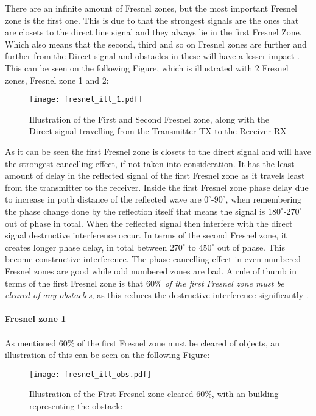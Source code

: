 There are an infinite amount of Fresnel zones, but the most important Fresnel zone is the first one. This is due to that the strongest signals are the ones that are closets to the direct line signal %
and they always lie in the first Fresnel Zone.  
Which also means that the second, third and so on Fresnel zones are further and further from the Direct signal and obstacles in these will have a lesser impact \citep{introRF}. This can be seen on the following Figure, which is illustrated with 2 Fresnel zones, Fresnel zone 1 and 2:
\begin{figure}[H]
\centering
\texttt{[image: fresnel\_ill\_1.pdf]}
\caption{Illustration of the First and Second Fresnel zone, along with the Direct signal travelling from the Transmitter TX to the Receiver RX}
\label{dijdk}
\end{figure}

As it can be seen the first Fresnel zone is closets to the direct signal and will have the strongest cancelling effect, if not taken into consideration. It has the least amount of delay in the reflected signal of the first Fresnel zone as it travels least from the transmitter to the receiver. Inside the first Fresnel zone phase delay due to increase in path distance of the reflected wave are $0^\circ$-$90^\circ$, when remembering the phase change done by the reflection itself that means the signal is $180^\circ$-$270^\circ$ out of phase in total. When the reflected signal then interfere with the direct signal destructive interference occur. In terms of the second Fresnel zone, it creates longer phase delay, in total between $270^\circ$ to $450^\circ$ out of phase. This become constructive interference. The phase cancelling effect in even numbered Fresnel zones are good while odd numbered zones are bad. A rule of thumb in terms of the first Fresnel zone is that \textit{$60\%$ of the first Fresnel zone must be cleared of any obstacles}, as this reduces the destructive interference significantly \citep{introRF}\citep{Fres2}. 
\\
\\


\textbf{Fresnel zone 1}
\\
\\
As mentioned $60\%$ of the first Fresnel zone must be cleared of objects, an illustration of this can be seen on the following Figure:
\begin{figure}[H]
\centering
\texttt{[image: fresnel\_ill\_obs.pdf]}
\caption{Illustration of the First Fresnel zone cleared $60\%$, with an building representing the obstacle}
\label{dijdk1}
\end{figure}


